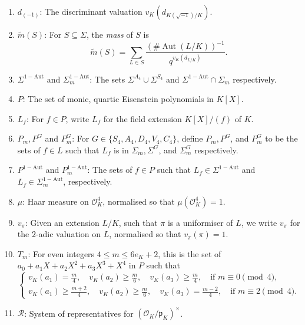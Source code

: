 \documentclass[11pt]{amsart}
\theoremstyle{theorem}
\theoremstyle{example}
\theoremstyle{definition}
\numberwithin{theorem}{section}
\numberwithin{theorem}{section}
\DeclareMathOperator{\Gal}{Gal}
\DeclareMathOperator{\Aut}{Aut}
\newcommand{\co}{\mathcal{O}}
\newcommand{\p}{\mathfrak{p}}
\newcommand{\m}{\widetilde{m}}
\newcommand{\oneaut}{\mathrm{1-Aut}}
\begin{document}
\begin{enumerate}
\begin{enumerate}
        \item $\Sigma^G := \{L \in \Sigma : \Gal(\widetilde{L}/K) \cong G\}$.
        \item $\Sigma_m := \{L \in \Sigma : v_K(d_{L/K}) = m\}$.
        \item $\Sigma_m^G := \Sigma_m \cap \Sigma^G$. 
    \end{enumerate}
    \item $d_{(-1)}$: The discriminant valuation $v_K(d_{K(\sqrt{-1})/K})$.
    \item $\m(S)$: For $S \subseteq \Sigma$, the \emph{mass} of $S$ is $$\m(S) = \sum_{L \in S} \frac{(\#\Aut(L/K))^{-1}}{q^{v_K(d_{L/K})}}.$$ 
    \item $\Sigma^{\oneaut}$ and $\Sigma^{\oneaut}_m$: The sets $\Sigma^{A_4}\cup \Sigma^{S_4}$ and $\Sigma^{\oneaut}\cap \Sigma_m$ respectively. 
    \item $P$: The set of monic, quartic Eisenstein polynomials in $K[X]$. 
    \item $L_f$: For $f \in P$, write $L_f$ for the field extension $K[X]/(f)$ of $K$.
    \item $P_m, P^G$ and $P^G_m$: For $G \in \{S_4, A_4, D_4, V_4, C_4\}$, define $P_m, P^G$, and $P^G_m$ to be the sets of $f \in L$ such that $L_f$ is in $\Sigma_m, \Sigma^G$, and $\Sigma^G_m$ respectively.
    \item $P^{\oneaut}$ and $P_m^{\oneaut}$: The sets of $f \in P$ such that $L_f \in \Sigma^{\oneaut}$ and $L_f \in \Sigma_m^{\oneaut}$, respectively.
    \item $\mu$: Haar measure on $\co_K^4$, normalised so that $\mu(\co_K^4) = 1$. 
    \item $v_\pi$: Given an extension $L/K$, such that $\pi$ is a uniformiser of $L$, we write $v_\pi$ for the $2$-adic valuation on $L$, normalised so that $v_\pi(\pi) = 1$.
    \item $T_m$: For even integers $4 \leq m \leq 6e_K + 2$, this is the set of $a_0 + a_1 X + a_2X^2 + a_3X^3 + X^4$ in $P$ such that 
    $$
    \begin{cases}
        v_K(a_1)= \frac{m}{4}, \quad v_K(a_2)\geq \frac{m}{6},\quad v_K(a_3) \geq \frac{m}{4}, \quad \text{if $m\equiv 0 \pmod{4}$},
        \\
        v_K(a_1) \geq \frac{m+2}{4},\quad v_K(a_2)\geq \frac{m}{6},\quad v_K(a_3) = \frac{m-2}{4},\quad \text{if $m \equiv 2\pmod{4}$}. 
    \end{cases}
    $$
    \item $\mathcal{R}$: System of representatives for $(\co_K/\p_K)^\times$.

\end{enumerate}
\end{document}
